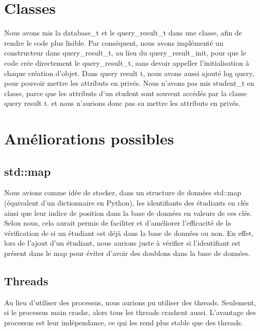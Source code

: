 \documentclass[utf8]{article}
\begin{document}
\section{Classes}
\indent{}
\par
Nous avons mis la database\_t et le query\_result\_t dans une classe, afin de rendre le code plus lisible. Par conséquent,
nous avons implémenté un constructeur dans query\_result\_t, au lieu du query\_result\_init, pour que le code
crée directement le query\_result\_t, sans devoir appeller l'initialisation à chaque création d'objet.
Dans query result t, nous avons aussi ajouté log query, pour pouvoir mettre les attributs en privés.
Nous n'avons pas mis student\_t en classe, parce que les attributs d'un student sont souvent accédés par la classe query result t.
et nous n'aurions donc pas su mettre les attributs en privés.


\section{Améliorations possibles}
    \subsection{std::map}
    \indent{}
\par
    Nous avions comme idée de stocker, dans un structure de données std::map (équivalent d'un dictionnaire en Python), les identifiants des étudiants en clés ainsi que leur indice de position dans la base de données en valeurs de ces clés. \newline
    Selon nous, cela aurait permis de faciliter et d'améliorer l'efficacité de la vérification de si un étudiant est déjà dans la base de données ou non. \newline En effet, lors de l'ajout d'un étudiant, nous aurions juste à vérifier si l'identifiant est présent dans le map pour éviter d'avoir des doublons dans la base de données.
    \subsection{Threads}
    \indent{}
    \par
    Au lieu d'utiliser des processus, nous aurions pu utiliser des threads. Seulement, si le processus main crashe,
    alors tous les threads crashent aussi. L'avantage des processus est leur indépendance, ce qui les rend plus stable que des threads.
\end{document}
